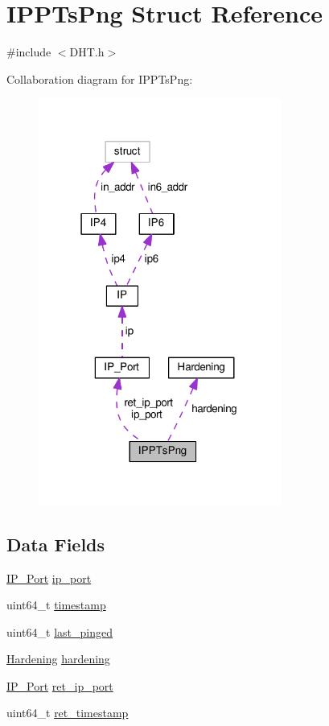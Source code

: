 \hypertarget{struct_i_p_p_ts_png}{\section{I\+P\+P\+Ts\+Png Struct Reference}
\label{struct_i_p_p_ts_png}
}


{\ttfamily \#include $<$D\+H\+T.\+h$>$}



Collaboration diagram for I\+P\+P\+Ts\+Png\+:
\nopagebreak
\begin{figure}[H]
\begin{center}
\leavevmode
\includegraphics[width=226pt]{d1/d00/struct_i_p_p_ts_png__coll__graph}
\end{center}
\end{figure}
\subsection*{Data Fields}
\begin{DoxyCompactItemize}
\item 
\hyperlink{struct_i_p___port}{I\+P\+\_\+\+Port} \hyperlink{struct_i_p_p_ts_png_a86e2a5a56c0dd22df6e8b8a10e40f9e4}{ip\+\_\+port}
\item 
uint64\+\_\+t \hyperlink{struct_i_p_p_ts_png_a465bef81f6478756e5443025b1f2ddfa}{timestamp}
\item 
uint64\+\_\+t \hyperlink{struct_i_p_p_ts_png_a4049204f6c392628d31be6c39f03e031}{last\+\_\+pinged}
\item 
\hyperlink{struct_hardening}{Hardening} \hyperlink{struct_i_p_p_ts_png_a247a5bc6669d45b7241b58223ce8fd1d}{hardening}
\item 
\hyperlink{struct_i_p___port}{I\+P\+\_\+\+Port} \hyperlink{struct_i_p_p_ts_png_a28f2dcc657352ee4855d05ed42e4a4af}{ret\+\_\+ip\+\_\+port}
\item 
uint64\+\_\+t \hyperlink{struct_i_p_p_ts_png_a5a40b83400feebb632862f593ad5e4a7}{ret\+\_\+timestamp}
\end{DoxyCompactItemize}


